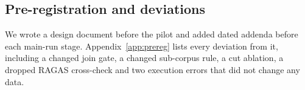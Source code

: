 \subsection{Pre-registration and deviations}
\label{sec:deviations}
We wrote a design document before the pilot and added dated addenda before each main-run stage.
Appendix~\ref{app:prereg} lists every deviation from it, including a changed join gate, a changed sub-corpus rule, a cut ablation, a dropped RAGAS cross-check and two execution errors that did not change any data.
